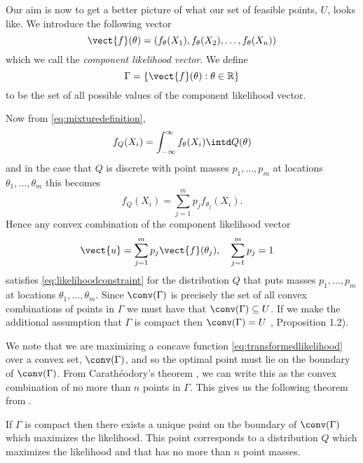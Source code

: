 	Our aim is now to get a better picture of what our set of feasible points, $U$, looks like. We introduce the following vector
	\begin{equation}
	\vect{f}(\theta) = (f_\theta(X_1),f_\theta(X_2),\dots,f_\theta(X_n))
	\end{equation}
	which we call the \emph{component likelihood vector}. We define
	\begin{equation}
	\Gamma = \left\{ \vect{f}(\theta) : \theta \in \mathbb{R} \right\}
	\end{equation}
	to be the set of all possible values of the component likelihood vector.

	Now from \eqref{eq:mixturedefinition},
	\begin{equation}
	f_Q(X_i) = \int_{-\infty}^{\infty} f_\theta(X_i) \intd Q(\theta)
	\end{equation}
	and in the case that $Q$ is discrete with point masses $p_1,\dots,p_m$ at locations $\theta_1,\dots,\theta_m$ this becomes
	\begin{equation}
	f_Q(X_i) = \sum_{j = 1}^m p_j f_{\theta_j}(X_i).
	\end{equation}
	Hence any convex combination of the component likelihood vector
	\begin{align}
	\vect{u} &= \sum_{j = 1}^m p_j \vect{f}(\theta_j), && \sum_{j=1}^m p_j = 1
	\end{align}
	satisfies \eqref{eq:likelihoodconstraint} for the distribution $Q$ that puts masses $p_1,\dots,p_m$ at locations $\theta_1,\dots,\theta_m$. Since $\conv(\Gamma)$ is precisely the set of all convex combinations of points in $\Gamma$ we must have that $\conv(\Gamma) \subseteq U$. If we make the additional assumption that $\Gamma$ is compact then $\conv(\Gamma) = U$ \cite{Phelps2001-ba}, Proposition 1.2). 

	We note that we are maximizing a concave function \eqref{eq:transformedlikelihood} over a convex set, $\conv(\Gamma)$, and so the optimal point must lie on the boundary of $\conv(\Gamma)$. From Carathéodory's theorem \cite{Roberts1973-cx}, we can write this as the convex combination of no more than $n$ points in $\Gamma$. This gives us the following theorem from \cite{Lindsay1983-tf}.

	\begin{theorem}
		If $\Gamma$ is compact then there exists a unique point on the boundary of $\conv(\Gamma)$ which maximizes the likelihood. This point corresponds to a distribution $Q$ which maximizes the likelihood and that has no more than $n$ point masses.
		\label{thm:LindsayGamma}
	\end{theorem}


